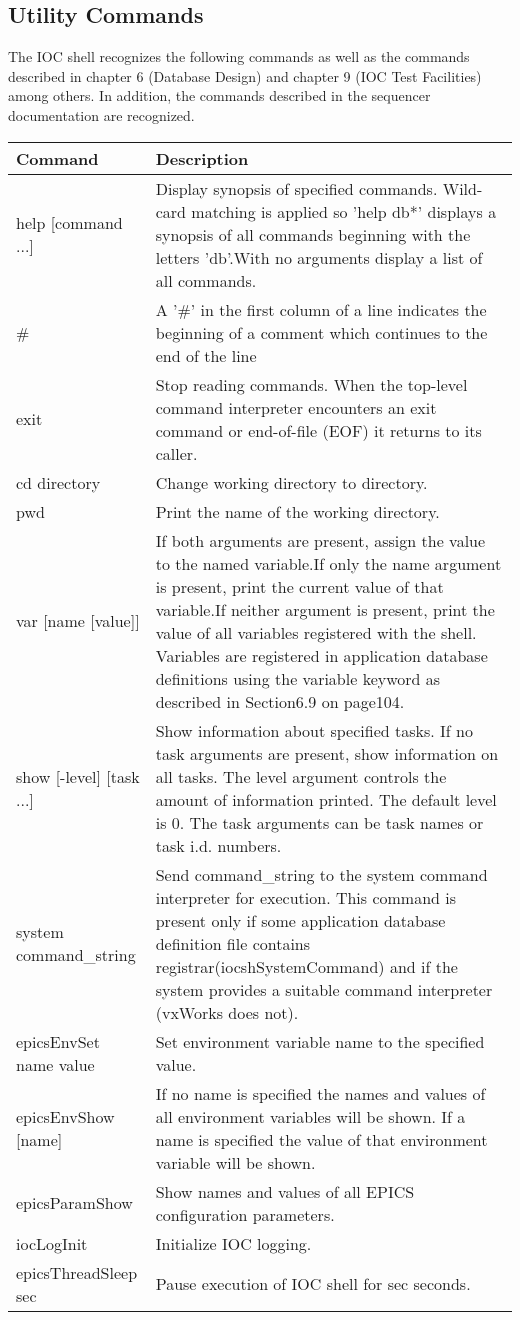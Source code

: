 \subsection{Utility Commands}

The IOC shell recognizes the following commands as well as the commands described in chapter 6 (Database Design) and 
chapter 9 (IOC Test Facilities) among others.  In addition, the commands described in the sequencer documentation are 
recognized.
\begin{center}\begin{longtable}{p{1.59082in}p{5.21418in}}
Command & Description\\
\hline
help [command ...] & Display synopsis of specified commands.  Wild-card matching is applied so 'help db*' displays a synopsis of all commands beginning with the letters 'db'.With no arguments display a list of all commands.\\
\# & A '\#' in the first column of a line indicates the beginning of a comment which continues to the end of the line\\
exit & Stop reading commands. When the top-level command interpreter encounters an exit command or end-of-file (EOF) it returns to its caller.\\
cd directory & Change working directory to directory.\\
pwd & Print the name of the working directory.\\
var [name [value]] & If both arguments are present, assign the value to the named variable.If only the name argument is present, print the current value of that variable.If neither argument is present, print the value of all variables registered with the shell.  Variables are registered in application database definitions using the variable keyword as described in Section6.9 on page104.\\
show [-level] [task ...] & Show information about specified tasks.  If no task arguments are present, show information on all tasks.  The level argument controls the amount of information printed.  The default level is 0.  The task arguments can be task names or task i.d. numbers.\\
system command\_string & Send command\_string to the system command interpreter for execution.  This command is present only if some application database definition file contains registrar(iocshSystemCommand) and if the system provides a suitable command interpreter (vxWorks does not).\\
epicsEnvSet name value & Set environment variable name to the specified value.\\
epicsEnvShow  [name] & If no name is specified the names and values of all environment variables will be shown. If a name is specified the value of that environment variable will be shown.\\
epicsParamShow & Show names and values of all EPICS configuration parameters.\\
iocLogInit & Initialize IOC logging.\\
epicsThreadSleep sec & Pause execution of IOC shell for sec seconds.
\end{longtable}\end{center}


